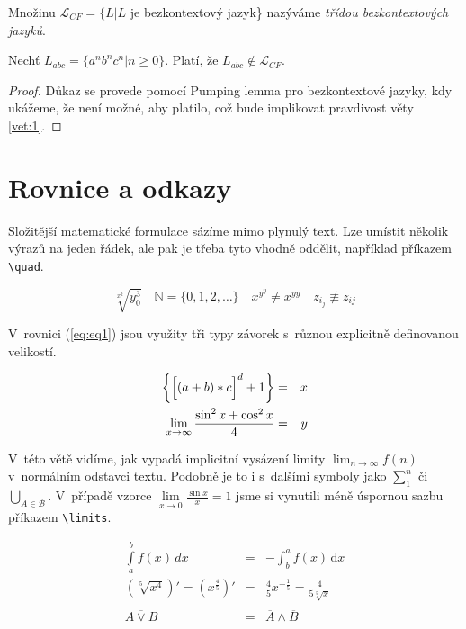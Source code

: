 \documentclass[11pt,a4paper,twocolumn]{article}
\begin{document}
\begin{dfn} Množinu $\mathcal{L}_{CF}=\{L|L $ je bez\-kon\-tex\-to\-vý jazyk\} nazýváme \emph{třídou bezkontextových jazyků}.\end{dfn}

\begin{vet}\label{vet:1} Nechť $L_{abc}=\{a^nb^nc^n|n\geq 0\}$. Platí, že $L_{abc}\notin\mathcal{L}_{CF}$.\end{vet}

\begin{proof} Důkaz se provede pomocí Pumping lemma pro bezkontextové jazyky, kdy ukážeme, že není možné, aby platilo, což bude implikovat pravdivost věty \ref{vet:1}.\end{proof}

\section{Rovnice a odkazy}

Složitější matematické formulace sázíme mimo plynulý text. Lze umístit několik výrazů na jeden řádek, ale pak je třeba tyto vhodně oddělit, například příkazem \verb|\quad|.

$$\sqrt[x^2]{y_0^3} \quad \mathbb{N}=\{0,1,2,\ldots\} \quad x^{y^y}\not = x^{yy} \quad z_{i_j}\not\equiv z_{ij}$$

V~rovnici (\ref{eq:eq1}) jsou využity tři typy závorek s~různou explicitně definovanou velikostí.

\begin{eqnarray}
\label{eq:eq1}\left\{\Bigl[(a+b)*c\Bigr]^d+1\right\} &=& x\\
\lim\limits _{x\rightarrow\infty}\frac{\sin^2x+\cos^2x}{4} &=& y\nonumber
\end{eqnarray}

V~této větě vidíme, jak vypadá implicitní vysázení limity $\lim_{n\rightarrow\infty}f(n)$ v~normálním odstavci textu. Podobně je to i s~dalšími symboly jako $\sum_1^n$ či $\bigcup_{A\in\mathcal{B}}$. V~případě vzorce $\lim\limits_{x\rightarrow 0}\frac{\sin x}{x} \!=\! 1 $ jsme si vynutili méně úspornou sazbu příkazem \verb|\limits|.

\begin{eqnarray}
\int\limits _a^bf(x)\mathrm\,{d}x & = & -\int_b^af(x)\,\mathrm{d}x\\
\left(\sqrt[5]{x^4}\right)'=\left(x^{\frac{4}{5}}\right)'&=&\frac{4}{5}x^{-\frac{1}{5}}=\frac{4}{5\sqrt[5]{x}}\\
\overline{\overline{A\vee B}} &=& \overline{\overline{A}\wedge\overline{B}}
\end{eqnarray}
\end{document}
